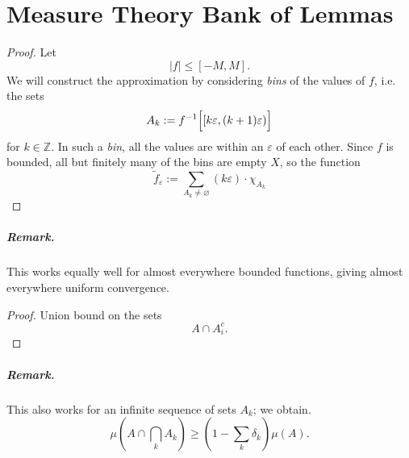 \chapter{Measure Theory Bank of Lemmas}

\begin{proof}
    Let
    \[ 
        \left\lvert f \right\rvert \leqslant [-M, M]. 
   \]
    We will construct the approximation by considering \emph{bins} of the values of \( f \), i.e. the sets
    \[ 
        A_k := f^{-1} \Bigl [ [k\varepsilon, (k+1) \varepsilon) \Bigr ]
   \]
   for \( k \in \mathbb{Z} \). In such a \emph{bin}, all the values are within an \(\varepsilon \) of each other. Since \( f \) is bounded, all but finitely many of the bins are empty \( X \), so the function
   \[ 
       \widetilde{f}_\varepsilon := \sum_{A_k \neq \varnothing} (k\varepsilon) \cdot \chi_{A_k}
  \]
\end{proof}
\paragraph{Remark.} This works equally well for almost everywhere bounded functions, giving almost everywhere uniform convergence.

\begin{proof}
    Union bound on the sets
    \[
        A \cap A_i^c.
    \]
\end{proof}

\paragraph{Remark.} This also works for an infinite sequence of sets \( A_k \); we obtain.
\[ 
    \mu \left( A \cap \bigcap_k A_k \right) \geqslant \left( 1 - \sum_k \delta_k \right)\mu(A). 
\]

